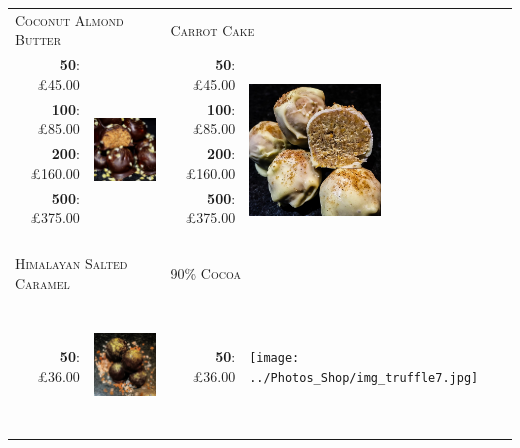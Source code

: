 \documentclass[11pt, english]{article}
\begin{document}
	\begin{table}[h]
	\begin{center}
	\begin{tabular}{r|p{4cm}r|p{4cm}}
		\multicolumn{2}{l}{\textsc{Coconut Almond Butter}} & \multicolumn{2}{l}{\textsc{Carrot Cake}}\\
		\textbf{50}: \pounds45.00 & \multirow{8}{*}{\includegraphics[width=3.5cm,height=3.5cm]{../Photos_Shop/img_truffle1.jpg}} & \textbf{50}: \pounds45.00 & \multirow{8}{*}{\includegraphics[width=3.5cm,height=3.5cm]{../Photos_Shop/img_truffle5.jpg}}\\
		\textbf{100}: \pounds85.00 & & \textbf{100}: \pounds85.00 & \\
		\textbf{200}: \pounds160.00 & & \textbf{200}: \pounds160.00 & \\
		\textbf{500}: \pounds375.00 & & \textbf{500}: \pounds375.00 & \\
		\multicolumn{4}{l}{}\\
		\multicolumn{4}{l}{}\\
		\multicolumn{4}{l}{}\\
		\multicolumn{4}{l}{}\\
		\multicolumn{2}{l}{\textsc{Himalayan Salted Caramel}} & \multicolumn{2}{l}{\textsc{90\% Cocoa}}\\
		\textbf{50}: \pounds36.00 & \multirow{5}{*}{\includegraphics[width=3.5cm,height=3.5cm]{../Photos_Shop/img_truffle6.jpg}} & \textbf{50}: \pounds36.00 & \multirow{5}{*}{\texttt{[image: ../Photos\_Shop/img\_truffle7.jpg]}}\\

\end{tabular}
\end{center}
\end{table}
\end{document}
